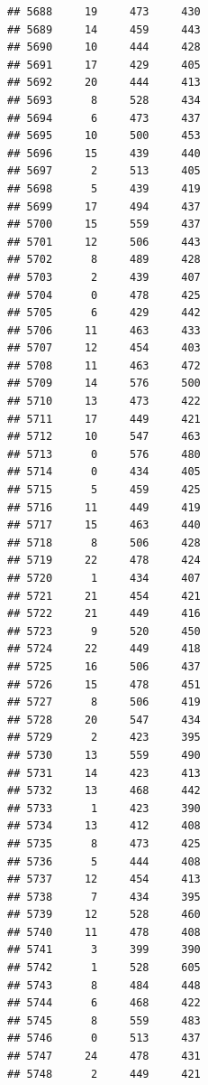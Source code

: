 \documentclass[man]{apa6}
\begin{document}
\begin{verbatim}
## 5688     19     473     430
## 5689     14     459     443
## 5690     10     444     428
## 5691     17     429     405
## 5692     20     444     413
## 5693      8     528     434
## 5694      6     473     437
## 5695     10     500     453
## 5696     15     439     440
## 5697      2     513     405
## 5698      5     439     419
## 5699     17     494     437
## 5700     15     559     437
## 5701     12     506     443
## 5702      8     489     428
## 5703      2     439     407
## 5704      0     478     425
## 5705      6     429     442
## 5706     11     463     433
## 5707     12     454     403
## 5708     11     463     472
## 5709     14     576     500
## 5710     13     473     422
## 5711     17     449     421
## 5712     10     547     463
## 5713      0     576     480
## 5714      0     434     405
## 5715      5     459     425
## 5716     11     449     419
## 5717     15     463     440
## 5718      8     506     428
## 5719     22     478     424
## 5720      1     434     407
## 5721     21     454     421
## 5722     21     449     416
## 5723      9     520     450
## 5724     22     449     418
## 5725     16     506     437
## 5726     15     478     451
## 5727      8     506     419
## 5728     20     547     434
## 5729      2     423     395
## 5730     13     559     490
## 5731     14     423     413
## 5732     13     468     442
## 5733      1     423     390
## 5734     13     412     408
## 5735      8     473     425
## 5736      5     444     408
## 5737     12     454     413
## 5738      7     434     395
## 5739     12     528     460
## 5740     11     478     408
## 5741      3     399     390
## 5742      1     528     605
## 5743      8     484     448
## 5744      6     468     422
## 5745      8     559     483
## 5746      0     513     437
## 5747     24     478     431
## 5748      2     449     421
\end{verbatim}
\end{document}
